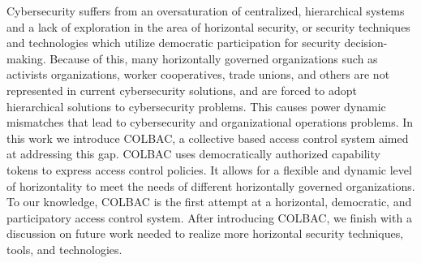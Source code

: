 Cybersecurity suffers from an oversaturation of centralized, hierarchical
systems and a lack of exploration in the area of horizontal security, or
security techniques and technologies which utilize democratic participation for
security decision-making. Because of this, many horizontally governed
organizations such as activists organizations, worker cooperatives, trade
unions, and others are not represented in current cybersecurity solutions, and
are forced to adopt hierarchical solutions to cybersecurity problems. This
causes power dynamic mismatches that lead to cybersecurity and organizational
operations problems. In this work we introduce COLBAC, a collective based access
control system aimed at addressing this gap. COLBAC uses democratically
authorized capability tokens to express access control policies. It allows for
a flexible and dynamic level of horizontality to meet the needs of different
horizontally governed organizations. To our knowledge, COLBAC is the first
attempt at a horizontal, democratic, and participatory  access control system.
After introducing COLBAC, we finish with a discussion on future work needed to
realize more horizontal security techniques, tools, and technologies.
